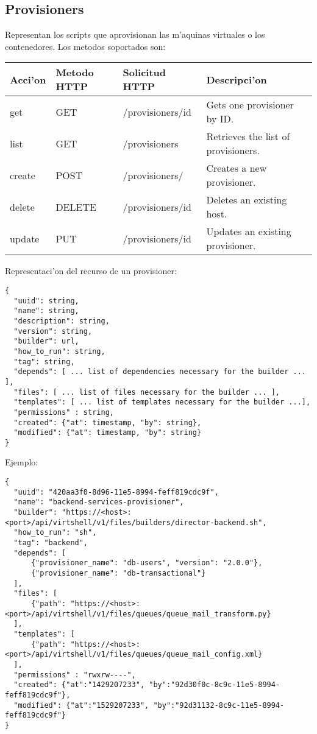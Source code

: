 \subsection{Provisioners}
Representan los scripts que aprovisionan las m'aquinas virtuales o los contenedores. Los metodos soportados son:

\begin{center}
 \begin{tabular}{| l | l | l | l |}
 \hline
  \rowcolor{blueapi}
  \textbf{Acci'on} & \textbf{Metodo HTTP} & \textbf{Solicitud HTTP} & \textbf{Descripci'on} \\ [0.5ex] 
  \hline\hline
  get & GET & /provisioners/id & Gets one provisioner by ID. \\
  \hline
  list & GET & /provisioners & Retrieves the list of provisioners. \\
  \hline  
  create & POST & /provisioners/ & Creates a new provisioner. \\
  \hline
  delete & DELETE & /provisioners/id & Deletes an existing host. \\
  \hline  
  update & PUT & /provisioners/id & Updates an existing provisioner. \\ [1ex] 
  \hline
\end{tabular}
\end{center}

Representaci'on del recurso de un provisioner:

\medskip
\begin{lstlisting}[style=json]
{
  "uuid": string,
  "name": string,
  "description": string,
  "version": string,
  "builder": url,
  "how_to_run": string,
  "tag": string,
  "depends": [ ... list of dependencies necessary for the builder ... ],
  "files": [ ... list of files necessary for the builder ... ],
  "templates": [ ... list of templates necessary for the builder ...],
  "permissions" : string,
  "created": {"at": timestamp, "by": string},
  "modified": {"at": timestamp, "by": string}
}

\end{lstlisting}

Ejemplo:

\medskip
\begin{lstlisting}[style=json]
{
  "uuid": "420aa3f0-8d96-11e5-8994-feff819cdc9f",
  "name": "backend-services-provisioner",
  "builder": "https://<host>:<port>/api/virtshell/v1/files/builders/director-backend.sh",
  "how_to_run": "sh",
  "tag": "backend",
  "depends": [
      {"provisioner_name": "db-users", "version": "2.0.0"},
      {"provisioner_name": "db-transactional"}
  ],
  "files": [
      {"path": "https://<host>:<port>/api/virtshell/v1/files/queues/queue_mail_transform.py}
  ],
  "templates": [
      {"path": "https://<host>:<port>/api/virtshell/v1/files/queues/queue_mail_config.xml}
  ],
  "permissions" : "rwxrw----",       
  "created": {"at":"1429207233", "by":"92d30f0c-8c9c-11e5-8994-feff819cdc9f"},
  "modified": {"at":"1529207233", "by":"92d31132-8c9c-11e5-8994-feff819cdc9f"}
}
\end{lstlisting}


